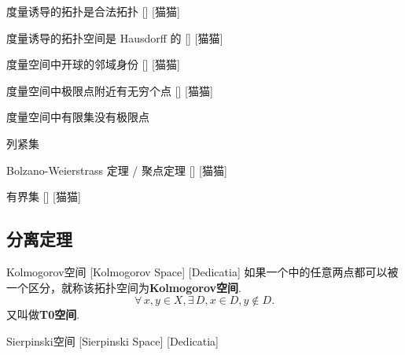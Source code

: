 \documentclass[UTF8]{ctexart}
\begin{document}
            \begin{ppt}
                []
                {度量诱导的拓扑是合法拓扑}
                []
                [猫猫]
            \end{ppt}

            \begin{ppt}
                []
                {度量诱导的拓扑空间是 Hausdorff 的}
                []
                [猫猫]
            \end{ppt}

            \begin{ppt}
                []
                {度量空间中开球的邻域身份}
                []
                [猫猫]
            \end{ppt}

            \begin{thm}
                []
                {度量空间中极限点附近有无穷个点}
                []
                [猫猫]
                
            \end{thm}

            \begin{crl}
                {度量空间中有限集没有极限点}
            \end{crl}

            \begin{dfn}
                {列紧集}
            \end{dfn}

            \begin{thm}
                []
                {Bolzano-Weierstrass 定理 / 聚点定理}
                []
                [猫猫]
            \end{thm}

            \begin{dfn}
                []
                {有界集}
                []
                [猫猫]
            \end{dfn}

        \subsection{分离定理}

            \begin{dfn}
                {Kolmogorov空间}
                [Kolmogorov Space]
                [Dedicatia]
                如果一个 中的任意两点都可以被一个 区分，就称该拓扑空间为\textbf{Kolmogorov空间}.
                \[\forall\,x,y\in X, \exists\,D, x\in D,y\notin D.\]
                又叫做\textbf{T0空间}.
            \end{dfn}

            \begin{xmp}
                {Sierpinski空间}
                [Sierpinski Space]
                [Dedicatia]
            \end{xmp}
            
\end{document}
